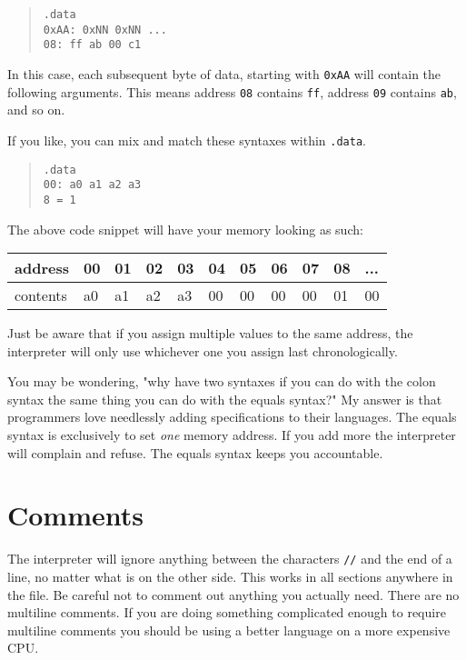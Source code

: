 \documentclass[12pt, oneside]{memoir}
\newcommand{\header}[1]{{\color{header}\texttt{#1}}}
\begin{document}
\begin{quotation}\texttt{\header{.data}\\
    {\color{imm}0xAA}: {\color{imm}0xNN} {\color{imm}0xNN} ...\\
    {\color{imm}08}: {\color{imm}ff} {\color{imm}ab} {\color{imm}00} {\color{imm}c1}
}\end{quotation}

In this case, each subsequent byte of data, starting with \texttt{{\color{imm}0xAA}} will contain the following arguments. This means address \texttt{{\color{imm}08}} contains \texttt{{\color{imm}ff}}, address \texttt{{\color{imm}09}} contains \texttt{{\color{imm}ab}}, and so on.

If you like, you can mix and match these syntaxes within \header{.data}.
\begin{quotation}\texttt{\header{.data}\\
    {\color{imm}00}: {\color{imm}a0} {\color{imm}a1} {\color{imm}a2} {\color{imm}a3}\\
    {\color{imm}8} = {\color{imm}1}
}\end{quotation}
The above code snippet will have your memory looking as such:
\begin{table}[H]
    \begin{tabular}{|l|l|l|l|l|l|l|l|l|l|l|}
    \hline
    address  & 00 & 01 & 02 & 03 & 04 & 05 & 06 & 07 & 08 & ... \\ \hline
    contents & a0 & a1 & a2 & a3 & 00 & 00 & 00 & 00 & 01 & 00  \\ \hline
    \end{tabular}
\end{table}

Just be aware that if you assign multiple values to the same address, the interpreter will only use whichever one you assign last chronologically.

You may be wondering, "why have two syntaxes if you can do with the colon syntax the same thing you can do with the equals syntax?" My answer is that programmers love needlessly adding specifications to their languages. The equals syntax is exclusively to set \textit{one} memory address. If you add more the interpreter will complain and refuse. The equals syntax keeps you accountable.

\section{Comments}
The interpreter will ignore anything between the characters \texttt{//} and the end of a line, no matter what is on the other side. This works in all sections anywhere in the file. Be careful not to comment out anything you actually need. There are no multiline comments. If you are doing something complicated enough to require multiline comments you should be using a better language on a more expensive CPU.
\end{document}
